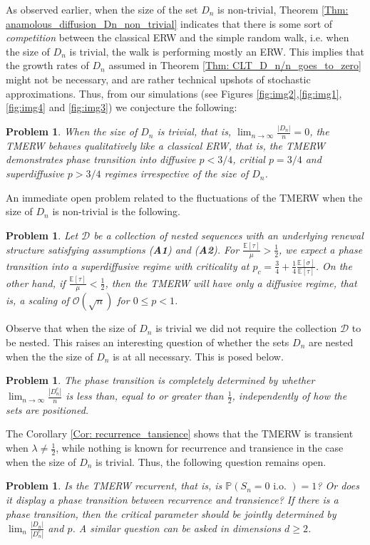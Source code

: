 \documentclass{article}
\numberwithin{equation}{section}
\newtheorem{problem}[theorem]{Problem}
\newcommand{\OO}{\mbox{${\mathcal O}$}}
\newcommand{\DD}{\mbox{${\mathcal D}$}}
\newcommand{\1}{\mathbf{1}}
\newcommand{\0}{\mathbf{0}}
\newcommand{\PP}{\mbox{${\mathbb P}$}}
\newcommand{\E}{\mbox{${\mathbb E}$}}
\begin{document}
As observed earlier, when the size of the set $D_n$ is non-trivial, Theorem \ref{Thm: anamolous_diffusion_Dn_non_trivial} indicates that there is some sort of \textit{competition} between the classical ERW and the simple random walk, i.e. when the size of $D_n$ is trivial, the walk is performing mostly an ERW. This implies that the growth rates of $D_n$ assumed in Theorem \ref{Thm: CLT_D_n/n_goes_to_zero} might not be necessary, and are rather technical upshots of stochastic approximations. Thus, from our simulations (see Figures \ref{fig:img2},\ref{fig:img1},\ref{fig:img4} and \ref{fig:img3}) we conjecture the following:  
\begin{problem}
\label{Conj: Fluctuations_D_n_trivial}
When the size of $D_n$ is trivial, that is, $\lim_{n \to \infty}\frac{|D_n|}{n}=0$, the TMERW behaves qualitatively like a classical ERW, that is, the TMERW demonstrates phase transition into diffusive $p< 3/4$, critial $p=3/4$ and superdiffusive $p>3/4$ regimes irrespective of the size of $D_n$.    
\end{problem}
An immediate open problem related to the fluctuations of the TMERW when the size of $D_n$ is non-trivial is the following.
\begin{problem}
\label{Conj: CLT_general_tau_sigma}
Let $\DD$ be a collection of nested sequences with an underlying renewal structure satisfying assumptions (\textbf{A1}) and (\textbf{A2}). For $\frac{\E [\tau]}{\mu} > \frac{1}{2}$, we expect a phase transition into a superdiffusive regime with criticality at $p_c= \frac{3}{4}+\frac{1}{4} \frac{\E \left[\sigma\right]}{\E \left[\tau \right]}$. 
On the other hand, if $\frac{\E [\tau]}{\mu} < \frac{1}{2}$, then the TMERW will have only a diffusive regime, that is, a scaling of $\OO(\sqrt{n})$ for $0 \le p <1$.  
\end{problem}
Observe that when the size of $D_n$ is trivial we did not require the collection $\DD$ to be nested. This raises an interesting question of whether the sets $D_n$ are nested when the the size of $D_n$ is at all necessary. This is posed below. 
\begin{problem}
\label{Conj: non-nested_D_n_non_trivial}
The phase transition is completely determined by whether $\lim_{n\to \infty}\frac{|D_n^c|}{n}$ is less than, equal to or greater than $\frac{1}{2}$, independently of how the sets are positioned. 
\end{problem}

The Corollary \ref{Cor: recurrence_tansience} shows that the TMERW is transient when $\lambda \neq \frac{1}{2}$, while nothing is known for recurrence and transience in the case when the size of $D_n$ is trivial. Thus, the following question remains open.
\begin{problem}
Is the TMERW recurrent, that is, is $\PP \left(S_n=0 \text{ i.o. }\right)=1$? Or does it display a phase transition between recurrence and transience? If there is a phase transition, then the critical parameter should be jointly determined by $\lim_{n}\frac{|D_n|}{|D_n^c|}$ and $p$. A similar question can be asked in dimensions $d \ge 2$. 
\end{problem}
\end{document}
